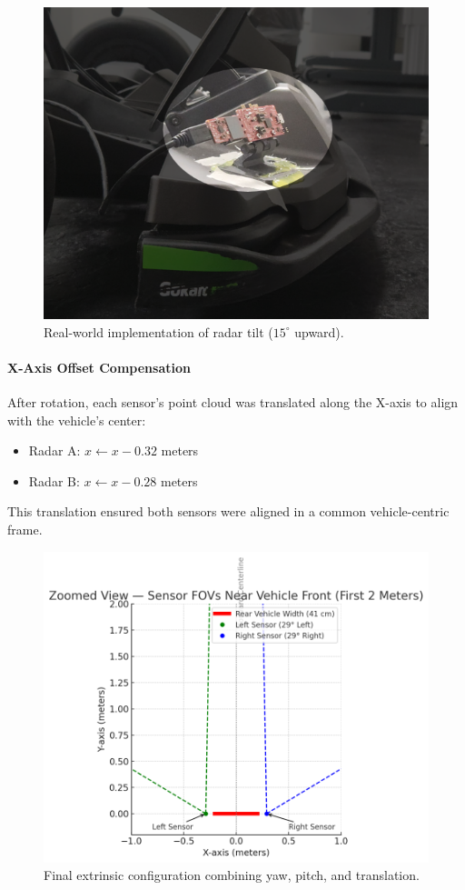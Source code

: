 \begin{figure}[!htbp]
    \centering
    \includegraphics[width=0.8\linewidth]{images/vehicleRadarTiltRotation.png}
    \caption{Real-world implementation of radar tilt ($15^\circ$ upward).}
    \label{fig:vehicleYawTilt}
\end{figure}

\paragraph{X-Axis Offset Compensation}
After rotation, each sensor's point cloud was translated along the X-axis to align with the vehicle's center:
\begin{itemize}
    \item Radar A: $x \leftarrow x - 0.32$ meters
    \item Radar B: $x \leftarrow x - 0.28$ meters
\end{itemize}

This translation ensured both sensors were aligned in a common vehicle-centric frame.

\begin{figure}[!htbp]
    \centering
    \includegraphics[width=0.8\linewidth]{images/RotationSensor.png}
    \caption{Final extrinsic configuration combining yaw, pitch, and translation.}
    \label{fig:extrinsics}
\end{figure}

